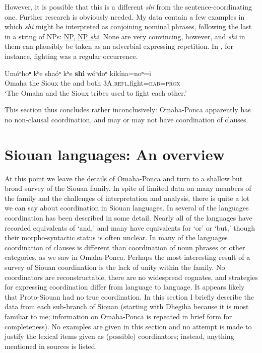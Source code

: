 \documentclass[output=paper]{LSP/langsci}
\begin{document}
However, it is possible that this is a different \textit{shi} from the sentence-coordinating one. Further research is obviously needed. My data contain a few examples in which \textit{shi} might be interpreted as conjoining nominal phrases, following the last in a string of NPs:  \underline{NP, NP \textit{shi}}. None are very convincing, however, and \textit{shi} in them can plausibly be taken as an adverbial expressing repetition. In , for instance, fighting was a regular occurrence.

\begin{exe}
\ex
\gll Um\'oⁿhoⁿ kʰe sha\'oⁿ kʰe \textbf{shi}  w\'oⁿdoⁿ 	kik\'ina=noⁿ=i \\
Omaha    	the 	Sioux  	the 	and both \textsc{3A}.\textsc{refl}.fight=\textsc{hab}=\textsc{prox} \\
\trans `The Omaha and the Sioux tribes used to fight each other.'    
\end{exe}

This section thus concludes rather inconclusively: Omaha-Ponca apparently has no non-clausal coordination, and may or may not have coordination of clauses. 

\section{Siouan languages: An overview}

At this point we leave the details of Omaha-Ponca and turn to a shallow but broad survey of the Siouan family. In spite of limited data on many members of the family and the challenges of interpretation and analysis, there is quite a lot we can say about coordination in Siouan languages. In several of the languages coordination has been described in some detail. Nearly all of the languages have recorded equivalents of `and,' and many have equivalents for `or' or `but,' though their morpho-syntactic status is often unclear. In many of the languages coordination of clauses is different than coordination of noun phrases or other categories, as we saw in Omaha-Ponca. Perhaps the most interesting result of a survey of Siouan coordination is the lack of unity within the family. No coordinators are reconstructable, there are no widespread cognates, and strategies for expressing coordination differ from language to language. It appears likely that Proto-Siouan had no true coordination. In this section I briefly describe the data from each sub-branch of Siouan (starting with Dhegiha because it is most familiar to me; information on Omaha-Ponca is repeated in brief form for completeness). No examples are given in this section and no attempt is made to justify the lexical items given as (possible) coordinators; instead, anything mentioned in sources is listed.
\end{document}
